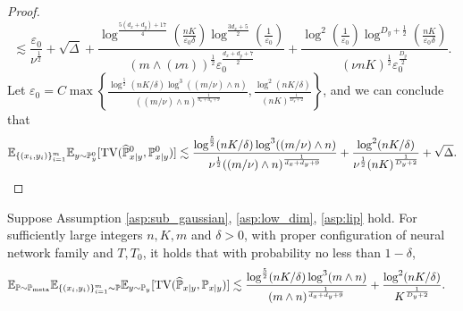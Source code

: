 \documentclass[11pt]{article}
\numberwithin{equation}{section}
\newcommand{\Pmeta}{\mathbb{P}_{\text{meta}}}
\renewcommand{\P}{\mathbb{P}}
\begin{document}
\begin{proof}
\begin{equation}
        \lesssim \frac{\varepsilon_0}{\nu^{\frac{1}{2}}} +\sqrt{\Delta}+\frac{\log^{\frac{5(d_x+d_y)+17}{4}}(\frac{nK}{\varepsilon_0\delta})
        \log^{\frac{3d_x+5}{2}}(\frac{1}{\varepsilon_0})}{(m\wedge (\nu n))^{\frac{1}{2}}\varepsilon_0^{\frac{d_x+d_y+7}{2}}}  + \frac{\log^2(\frac{1}{\varepsilon_0})\log^{D_y+\frac{1}{2}}(\frac{nK}{\varepsilon_0\delta})}{(\nu nK)^{\frac{1}{2}}\varepsilon_0^{\frac{D_y}{2}}}.
    \end{equation}
    Let $\varepsilon_0=C\max\left\{\frac{\log^{\frac{5}{2}}(nK/\delta)\log^3((m/\nu)\wedge n)}{((m/\nu)\wedge n)^{\frac{1}{d_x+d_y+9}}},\frac{\log^2(nK/\delta)}{(nK)^{\frac{1}{D_y+2}}}\right\}$, and we can conclude that
    \begin{equation}
        \E_{\{(x_i,y_i)\}_{i=1}^m}\E_{y\sim\P^0_y} [\mathrm{TV}(\widehat{\P}^0_{x|y},\P^0_{x|y})]
        \lesssim \frac{\log^{\frac{5}{2}}(nK/\delta)\log^3((m/\nu)\wedge n)}{\nu^{\frac{1}{2}}((m/\nu)\wedge n)^{\frac{1}{d_x+d_y+9}}}+\frac{\log^2(nK/\delta)}{\nu^{\frac{1}{2}}(nK)^{\frac{1}{D_y+2}}}+\sqrt{\Delta}.
    \end{equation}
\end{proof}

\begin{thm}
\label{thm:distribution}
    Suppose Assumption \ref{asp:sub_gaussian}, \ref{asp:low_dim}, \ref{asp:lip} hold.
    For sufficiently large integers $n,K,m$ and $\delta>0$, with proper configuration of neural network family and $T,T_0$, it holds that with probability no less than $1-\delta$,
    \begin{equation}
        \begin{aligned}
            \E_{\P\sim\Pmeta}\E_{\{(x_i,y_i)\}_{i=1}^m\sim \P}\E_{y\sim\P_y} [\mathrm{TV}(\widehat{\P}_{x|y},\P_{x|y})]
            &\lesssim \frac{\log^{\frac{5}{2}}(nK/\delta)\log^3(m\wedge n)}{(m\wedge n)^{\frac{1}{d_x+d_y+9}}}+\frac{\log^2(nK/\delta)}{K^{\frac{1}{D_y+2}}}.
        \end{aligned}
    \end{equation}
\end{thm}
\end{document}

